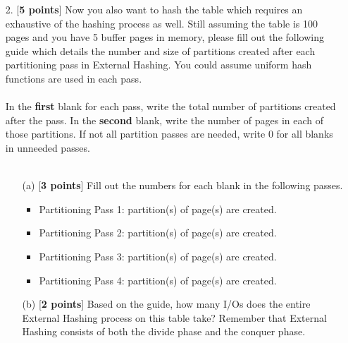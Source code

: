 \documentclass[10pt]{article}
\begin{document}
\begin{enumerate}
    \item[2.] [\textbf{5 points}] Now you also want to hash the table
        which requires an exhaustive of the hashing process as well. Still assuming the table is 100 pages and you have 5 buffer pages in memory, please fill out the following guide which details the number and size of partitions created after each partitioning pass in External Hashing. You could assume uniform hash functions are used in each pass.\\ \\
        In the \textbf{first} blank for each pass, write the total number of partitions created after the pass. In the \textbf{second}
        blank, write the number of pages in each of those partitions. If not all partition passes are needed, write 0
        for all blanks in unneeded passes.\\ \\
        \begin{enumerate}
            \item[(a)][\textbf{3 points}] Fill out the numbers for each blank in the following passes. \\
            \begin{itemize}
                \item Partitioning Pass 1: \underline{\quad\quad\quad\quad} partition(s) of \underline{\quad\quad\quad\quad} page(s) are created.\\
                \item Partitioning Pass 2: \underline{\quad\quad\quad\quad} partition(s) of \underline{\quad\quad\quad\quad} page(s) are created.\\
                \item Partitioning Pass 3: \underline{\quad\quad\quad\quad} partition(s) of \underline{\quad\quad\quad\quad} page(s) are created.\\
                \item Partitioning Pass 4: \underline{\quad\quad\quad\quad} partition(s) of \underline{\quad\quad\quad\quad} page(s) are created.\\
            \end{itemize}
            \item[(b)][\textbf{2 points}] Based on the guide, how many I/Os does the entire External Hashing process on this table
            take? Remember that External Hashing consists of both the divide phase and the conquer phase.
            \\
            \\
            \\
            \\
            \\
        \end{enumerate}
\end{enumerate}
\end{document}

